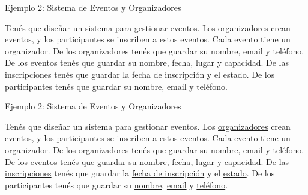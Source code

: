 \documentclass{beamer}
\begin{document}
\begin{frame}{Ejemplo 2: Sistema de Eventos y Organizadores}
    \begin{center}
        \small
        Tenés que diseñar un sistema para gestionar eventos. Los organizadores crean eventos, y los participantes se inscriben a estos eventos. Cada evento tiene un organizador. De los organizadores tenés que guardar su nombre, email y teléfono. De los eventos tenés que guardar su nombre, fecha, lugar y capacidad. De las inscripciones tenés que guardar la fecha de inscripción y el estado. De los participantes tenés que guardar su nombre, email y teléfono.
    \end{center}
\end{frame}

\begin{frame}{Ejemplo 2: Sistema de Eventos y Organizadores}
    \begin{center}
        \small
        Tenés que diseñar un sistema para gestionar eventos. Los \ul{organizadores} crean \ul{eventos}, y los \ul{participantes} se inscriben a estos eventos. Cada evento tiene un organizador. De los organizadores tenés que guardar su \ul{nombre}, \ul{email} y \ul{teléfono}. De los eventos tenés que guardar su \ul{nombre}, \ul{fecha}, \ul{lugar} y \ul{capacidad}. De las \ul{inscripciones} tenés que guardar la \ul{fecha de inscripción} y el \ul{estado}. De los participantes tenés que guardar su \ul{nombre}, \ul{email} y \ul{teléfono}.
    \end{center}
\end{frame}
\end{document}
